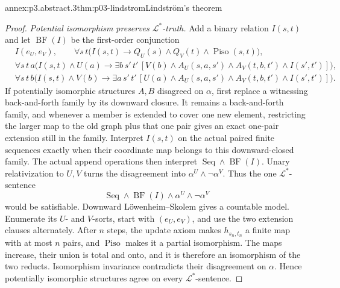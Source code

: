 \begin{annexitem}{annex:p3.abstract.3}{thm:p03-lindstrom}{Lindstr\"om's theorem}
\begin{proof}
\emph{Potential isomorphism preserves \(\mathcal L^*\)-truth.}
Add a binary relation \(I(s,t)\) and let \(\operatorname{BF}(I)\) be the
first-order conjunction
\[
\begin{aligned}
 &I(e_U,e_V),\qquad
   \forall s\,t\bigl(I(s,t)\to
      Q_U(s)\land Q_V(t)\land\operatorname{Piso}(s,t)\bigr),\\
 &\forall s\,t\,a\bigl(I(s,t)\land U(a)\to
   \exists b\,s'\,t'\,[V(b)\land A_U(s,a,s')\land A_V(t,b,t')
       \land I(s',t')]\bigr),\\
 &\forall s\,t\,b\bigl(I(s,t)\land V(b)\to
   \exists a\,s'\,t'\,[U(a)\land A_U(s,a,s')\land A_V(t,b,t')
       \land I(s',t')]\bigr).
\end{aligned}
\]
If potentially isomorphic structures \(A,B\) disagreed on \(\alpha\), first
replace a witnessing back-and-forth family by its downward closure.  It remains
a back-and-forth family, and whenever a member is extended to cover one new
element, restricting the larger map to the old graph plus that one pair gives
an exact one-pair extension still in the family.  Interpret \(I(s,t)\) on the
actual paired finite sequences exactly when their coordinate map belongs to
this downward-closed family.  The actual append operations then interpret
\(\operatorname{Seq}\land\operatorname{BF}(I)\).
Unary relativization to \(U,V\) turns the disagreement into
\(\alpha^U\land\neg\alpha^V\).  Thus the one
\(\mathcal L^*\)-sentence
\[
 \operatorname{Seq}\land\operatorname{BF}(I)
 \land\alpha^U\land\neg\alpha^V
\]
would be satisfiable.  Downward L\"owenheim--Skolem gives a countable model.
Enumerate its \(U\)- and \(V\)-sorts, start with \((e_U,e_V)\), and use the
two extension clauses alternately.  After \(n\) steps, the update axiom makes
\(h_{s_n,t_n}\) a finite map with at most \(n\) pairs, and
\(\operatorname{Piso}\) makes it a partial isomorphism.  The maps increase,
their union is total and onto, and it is therefore an isomorphism of the two
reducts.  Isomorphism invariance contradicts their disagreement on
\(\alpha\).  Hence potentially isomorphic structures agree on every
\(\mathcal L^*\)-sentence.


\end{proof}
\end{annexitem}
